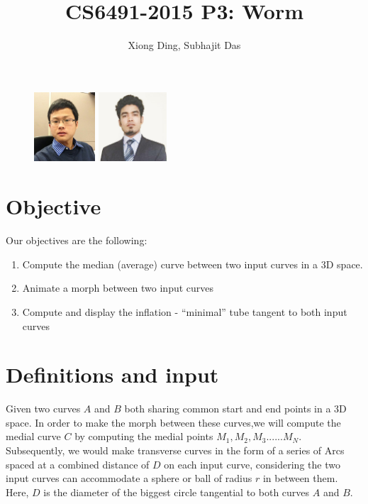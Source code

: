 \documentclass[twoside,11pt]{article}
\begin{document}
\title{CS6491-2015 P3: Worm}
\author{Xiong Ding, Subhajit Das}
\date{}
\maketitle
\begin{figure} [H]
    \centering
    \includegraphics[width=0.9in]{selfie}
    \includegraphics[width=1.0in]{das_PIC}
\end{figure}


\section{Objective}
Our objectives are the following:
 \begin{enumerate}
 \item Compute the median (average) curve between two input curves in a 3D space.
\item Animate a morph between two input curves 
\item Compute and display the inflation - “minimal” tube tangent to both input curves
 \end{enumerate}


\section{Definitions and input}
Given two curves $ A $ and $ B $ both sharing common start and end points in a 3D space. In order to make the morph between these curves,we will compute the medial curve $ C $ by computing the medial points $ M_1, M_2, M_3 ......M_N $.
Subsequently, we would make transverse curves in the form of a series of Arcs spaced at a combined distance of $D$ on each input curve, considering the two input curves can accommodate a sphere or ball of radius $ r $ in between them. Here, $D$ is the diameter of the biggest circle tangential to both curves $A$ and $B$.
\end{document}
